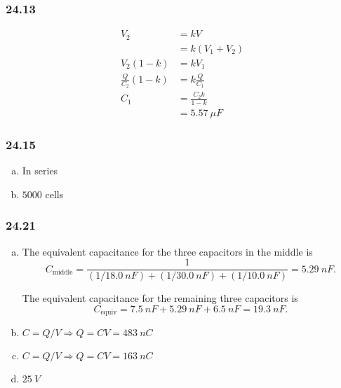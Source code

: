 \documentclass{article}
\begin{document}
\subsubsection{24.13}

\begin{align*}
  V_2                   & = k V                 \\
                        & = k (V_1 + V_2)       \\
  V_2 (1 - k)           & = k V_1               \\
  \frac{Q}{C_2} (1 - k) & = k \frac{Q}{C_1}     \\
  C_1                   & = \frac{C_2 k}{1 - k} \\
                        & = \qty{5.57}{\mu F}
\end{align*}

\subsubsection{24.15}

\begin{enumerate}[(a)]
  \item In series

  \item $5000$ cells
\end{enumerate}

\subsubsection{24.21}

\begin{enumerate}[(a)]
  \item The equivalent capacitance for the three capacitors in the middle is \[C_\text{middle} = \frac{1}{(1 / \qty{18.0}{nF}) + (1 / \qty{30.0}{nF}) + (1 / \qty{10.0}{nF})} = \qty{5.29}{nF}.\]

        The equivalent capacitance for the remaining three capacitors is \[C_\textrm{equiv} = \qty{7.5}{nF} + \qty{5.29}{nF} + \qty{6.5}{nF} = \qty{19.3}{nF}.\]

  \item $C = Q / V \Rightarrow Q = C V = \qty{483}{nC}$

  \item $C = Q / V \Rightarrow Q = C V = \qty{163}{nC}$

  \item $\qty{25}{V}$
\end{enumerate}
\end{document}
